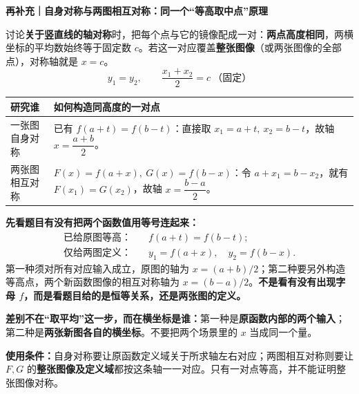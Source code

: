 \clearpage
\begin{statementbox}
\textbf{再补充｜自身对称与两图相互对称：同一个“等高取中点”原理}

讨论\textbf{关于竖直线的轴对称}时，把每个点与它的镜像配成一对：\textbf{两点高度相同}，两横坐标的平均数始终等于固定数 $c$。若这一对应覆盖\textbf{整张图像}（或两张图像的全部点），对称轴就是 $x=c$。
\[
\boxed{y_1=y_2,\qquad \frac{x_1+x_2}{2}=c\ \text{（固定）}}
\]
\begin{center}\renewcommand{\arraystretch}{1.48}
\begin{tabular}{p{.24\linewidth}|p{.57\linewidth}}
研究谁 & 如何构造同高度的一对点 \\\hline
一张图自身对称 & 已有 $f(a+t)=f(b-t)$：直接取 $x_1=a+t,\ x_2=b-t$，故轴 $x=\dfrac{a+b}{2}$。\\
两张图相互对称 & $F(x)=f(a+x),\ G(x)=f(b-x)$：令 $a+x_1=b-x_2$，就有 $F(x_1)=G(x_2)$，故轴 $x=\dfrac{b-a}{2}$。
\end{tabular}\end{center}
\textbf{先看题目有没有把两个函数值用等号连起来：}
\[\begin{aligned}
\text{已给原图等高：}\quad & f(a+t)=f(b-t);\\
\text{仅给两图定义：}\quad & y_1=f(a+x),\quad y_2=f(b-x).
\end{aligned}\]
第一种须对所有对应输入成立，原图的轴为 $x=(a+b)/2$；第二种要另外构造等高点，两个新函数图像的相互对称轴为 $x=(b-a)/2$。\textbf{不是看有没有出现字母 $f$，而是看题目给的是恒等关系，还是两张图的定义。}

\textbf{差别不在“取平均”这一步，而在横坐标是谁：}第一种是\textbf{原函数内部的两个输入}；第二种是\textbf{两张新图各自的横坐标}。不要把两个场景里的 $x$ 当成同一个量。

\textbf{使用条件：}自身对称要让原函数定义域关于所求轴左右对应；两图相互对称则要让 $F,G$ 的\textbf{整张图像及定义域}都按这条轴一一对应。只有一对点等高，并不能证明整张图像对称。
\end{statementbox}
